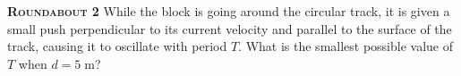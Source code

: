 \begin{problem}
{\textbf{\textsc{Roundabout 2}}} While the block is going around the circular track, it is given a small push perpendicular to its current velocity and parallel to the surface of the track, causing it to oscillate with period $T$. What is the smallest possible value of $T$ when $d = 5\;\mathrm{m}$?
\end{problem}